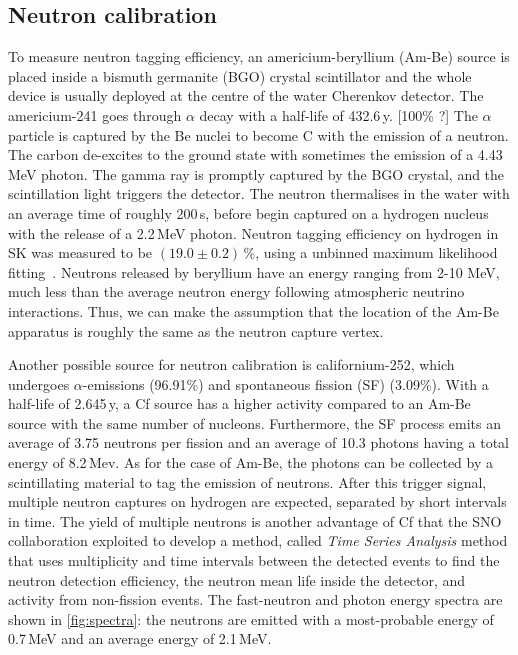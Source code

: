 \subsection{Neutron calibration}


To measure neutron tagging efficiency, an americium-beryllium (Am-Be) source is placed inside
a bismuth germanite (BGO) crystal scintillator and the whole device is usually deployed %
at the centre of the water Cherenkov detector.
The americium-241 goes through $\alpha$ decay with a half-life of 432.6\,y. [100\% ?]
The $\alpha$ particle is captured by the Be nuclei to become C\tapi{*} with the emission of a neutron.
The carbon de-excites to the ground state with sometimes the emission of a 4.43\,MeV photon.
The gamma ray is promptly captured by the BGO crystal, and the scintillation light triggers the detector.
The neutron thermalises in the water with an average time of roughly 200\,\textmu s, %
before begin captured on a hydrogen nucleus with the release of a 2.2\,MeV photon.
Neutron tagging efficiency on hydrogen in SK was measured to be $(19.0\pm0.2)$\,\%, %
using a unbinned maximum likelihood fitting~\cite{}.
Neutrons released by beryllium have an energy ranging from 2-10 MeV, %
much less than the average neutron energy following atmospheric neutrino interactions.
Thus, we can make the assumption that the location of the Am-Be apparatus is roughly the same %
as the neutron capture vertex.


Another possible source for neutron calibration is californium-252, which %
undergoes $\alpha$-emissions (96.91\%) and spontaneous fission (SF) (3.09\%).
With a half-life of 2.645\,y, a Cf source has a higher activity compared to an Am-Be source %
with the same number of nucleons.
Furthermore, the SF process emits an average of 3.75 neutrons per fission and an average of 10.3 photons %
having a total energy of 8.2\,Mev.
As for the case of Am-Be, the photons can be collected by a scintillating material to tag the %
emission of neutrons.
After this trigger signal, multiple neutron captures on hydrogen are expected, %
separated by short intervals in time.
The yield of multiple neutrons is another advantage of Cf that %
the SNO collaboration exploited to develop a method, called \emph{Time Series Analysis} method that uses %
multiplicity and time intervals between the detected events %
to find the neutron detection efficiency, the neutron mean life inside the detector, %
and activity from non-fission events.
The fast-neutron and photon energy spectra are shown in \ref{fig:spectra}: %
the neutrons are emitted with a most-probable energy of 0.7\,MeV and an average energy of 2.1\,MeV.

